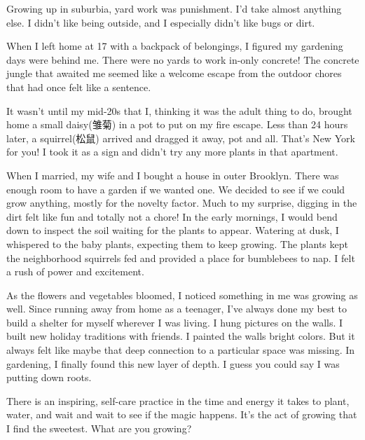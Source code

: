 \documentclass{英语试卷}
\begin{document}
\par Growing up in suburbia, yard work was punishment. I'd take almost anything else. I didn't like being outside, and I especially didn't like bugs or dirt.\par
\par When I left home at 17 with a backpack of belongings, I figured my gardening days were behind me. There were no yards to work in-only concrete! The concrete jungle that awaited me seemed like a welcome escape from the outdoor chores that had once felt like a sentence.\par
\par It wasn't until my mid-20s that I, thinking it was the adult thing to do, brought home a small daisy(雏菊) in a pot to put on my fire escape. Less than 24 hours later, a squirrel(松鼠) arrived and dragged it away, pot and all. That's New York for you! I took it as a sign and didn't try any more plants in that apartment.\par
\par When I married, my wife and I bought a house in outer Brooklyn. There was enough room to have a garden if we wanted one. We decided to see if we could grow anything, mostly for the novelty factor. Much to my surprise, digging in the dirt felt like fun and totally not a chore! In the early mornings, I would bend down to inspect the soil waiting for the plants to appear. Watering at dusk, I whispered to the baby plants, expecting them to keep growing. The plants kept the neighborhood squirrels fed and provided a place for bumblebees to nap. I felt a rush of power and excitement.\par
\par As the flowers and vegetables bloomed, I noticed something in me was growing as well. Since running away from home as a teenager, I've always done my best to build a shelter for myself wherever I was living. I hung pictures on the walls. I built new holiday traditions with friends. I painted the walls bright colors. But it always felt like maybe that deep connection to a particular space was missing. In gardening, I finally found this new layer of depth. I guess you could say I was putting down roots.\par
\par There is an inspiring, self-care practice in the time and energy it takes to plant, water, and wait and wait to see if the magic happens. It's the act of growing that I find the sweetest. What are you growing?\par
{}
\end{document}
